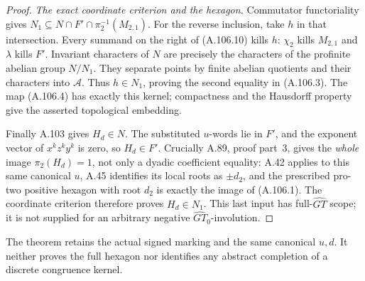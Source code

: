 \begin{proof}
\emph{The exact coordinate criterion and the hexagon.}
Commutator functoriality gives
\(N_1\subseteq N\cap F'\cap\pi_2^{-1}(M_{2,1})\).
For the reverse inclusion, take \(h\) in that intersection.
Every summand on the right of (A.106.10) kills \(h\):
\(\chi_2\) kills \(M_{2,1}\) and \(\lambda\) kills \(F'\).
Invariant characters of \(N\) are precisely the characters of
the profinite abelian group \(N/N_1\). They separate points by
finite abelian quotients and their characters into \(\mathcal A\).
Thus \(h\in N_1\), proving the second equality in (A.106.3).
The map (A.106.4) has exactly this kernel; compactness and the
Hausdorff property give the asserted topological embedding.

Finally A.103 gives \(H_d\in N\). The substituted \(u\)-words
lie in \(F'\), and the exponent vector of \(x^kz^ky^k\) is zero,
so \(H_d\in F'\). Crucially A.89, proof part~3, gives the
\emph{whole} image \(\pi_2(H_d)=1\), not only a dyadic
coefficient equality: A.42 applies to this same canonical \(u\),
A.45 identifies its local roots as \(\pm d_2\), and the
prescribed pro-two positive hexagon with root \(d_2\) is exactly
the image of (A.106.1). The coordinate criterion therefore proves
\(H_d\in N_1\). This last input has full-\(\widehat{GT}\) scope;
it is not supplied for an arbitrary negative
\(\widehat{GT}_0\)-involution.
\end{proof}

The theorem retains the actual signed marking and the same canonical
\(u,d\). It neither proves the full hexagon nor identifies any
abstract completion of a discrete congruence kernel.

